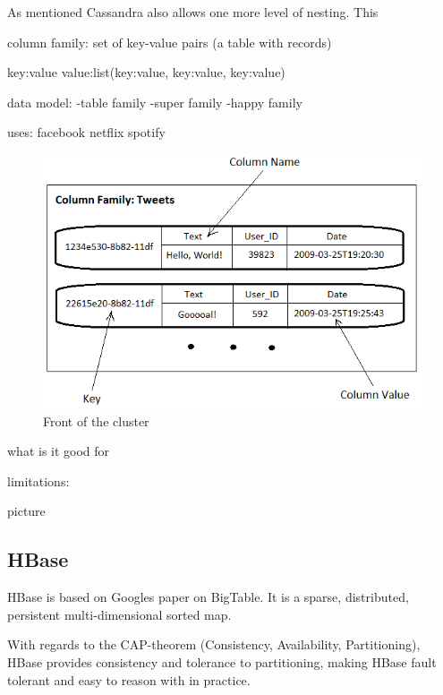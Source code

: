 As mentioned Cassandra also allows one more level of nesting. This 

column family: set of key-value pairs (a table with records)

key:value
value:list(key:value, key:value, key:value)


data model:
	-table family
	-super family
	-happy family

uses:
	facebook
	netflix
	spotify


\begin{figure}[ht]

\quad
\begin{minipage}[b]{0.45\linewidth}
    \includegraphics[width=1\textwidth]{resources/twitterschema-tweets.png}
    \caption{Front of the cluster}
    \label{fig:minipage2}
\end{minipage}
\end{figure}

what is it good for



limitations:
	
picture



\subsection{HBase}
HBase is based on Googles paper on BigTable.
It is a sparse, distributed, persistent multi-dimensional sorted map.

With regards to the CAP-theorem (Consistency, Availability, Partitioning), HBase provides consistency and tolerance to partitioning, making HBase fault tolerant and easy to reason with in practice.

